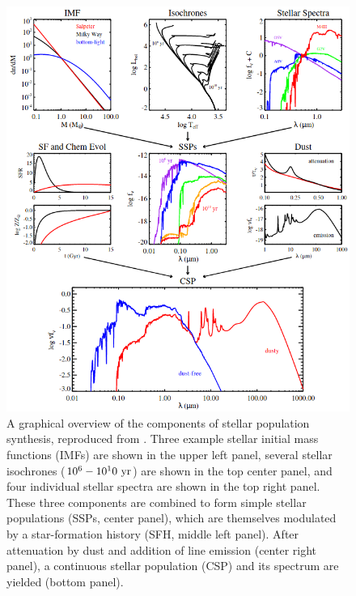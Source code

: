 \begin{figure}
    \centering
    \includegraphics[width=\textwidth]{conroy_sps_review}
    \caption[A graphical overview of the components of stellar population synthesis.]{A graphical overview of the components of stellar population synthesis, reproduced from \citet{conroy_sps_review}. Three example stellar initial mass functions (IMFs) are shown in the upper left panel, several stellar isochrones ($10^6 - 10^10 ~ {\rm yr}$) are shown in the top center panel, and four individual stellar spectra are shown in the top right panel. These three components are combined to form simple stellar populations (SSPs, center panel), which are themselves modulated by a star-formation history (SFH, middle left panel). After attenuation by dust and addition of line emission (center right panel), a continuous stellar population (CSP) and its spectrum are yielded (bottom panel).}
    \label{fig:conroy_sps_figure}
\end{figure}

